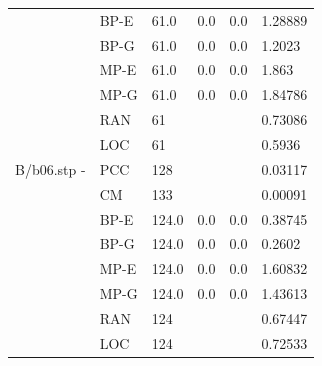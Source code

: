 \documentclass[12pt,a4paper]{article}
\begin{document}
\begin{center}
\begin{tabular}{l|l|l|l|l|l}
		&BP-E&61.0&0.0&0.0&1.28889\\
		&BP-G&61.0&0.0&0.0&1.2023\\
		&MP-E&61.0&0.0&0.0&1.863\\
		&MP-G&61.0&0.0&0.0&1.84786\\
		&RAN&61&&&0.73086\\
		&LOC&61&&&0.5936\\\hline
		B/b06.stp - &PCC&128&&&0.03117\\
		&CM&133&&&0.00091\\
		&BP-E&124.0&0.0&0.0&0.38745\\
		&BP-G&124.0&0.0&0.0&0.2602\\
		&MP-E&124.0&0.0&0.0&1.60832\\
		&MP-G&124.0&0.0&0.0&1.43613\\
		&RAN&124&&&0.67447\\
		&LOC&124&&&0.72533\\\hline
	\end{tabular}
\end{center}
\end{document}
